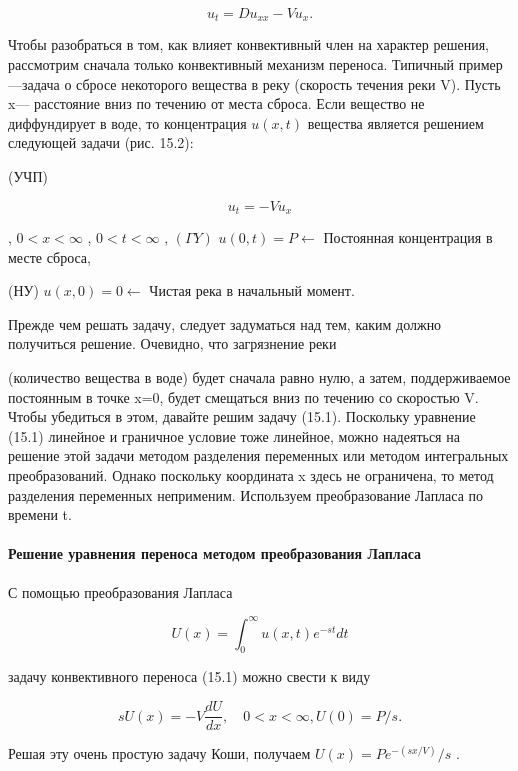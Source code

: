 \documentclass[
  ukrainian,
]{article}
\begin{document}
\[
u_t = Du_{xx} - Vu_x.
\]

Чтобы разобраться в том, как влияет конвективный член на характер
решения, рассмотрим сначала только конвективный механизм переноса.
Типичный пример---задача о сбросе некоторого вещества в реку (скорость
течения реки V). Пусть x--- расстояние вниз по течению от места сброса.
Если вещество не диффундирует в воде, то концентрация \(u(x, t)\)
вещества является решением следующей задачи (рис. 15.2):

(УЧП)

\[
u_t = -Vu_x
\]

, \(0 < x < \infty\) , \(0 < t < \infty\) , \((\Gamma Y)\)
\(u(0, t) = P \leftarrow\) Постоянная концентрация в месте сброса,

(НУ) \(u(x, 0) = 0 \leftarrow\) Чистая река в начальный момент.

Прежде чем решать задачу, следует задуматься над тем, каким должно
получиться решение. Очевидно, что загрязнение реки

(количество вещества в воде) будет сначала равно нулю, а затем,
поддерживаемое постоянным в точке x=0, будет смещаться вниз по течению
со скоростью V. Чтобы убедиться в этом, давайте решим задачу (15.1).
Поскольку уравнение (15.1) линейное и граничное условие тоже линейное,
можно надеяться на решение этой задачи методом разделения переменных или
методом интегральных преобразований. Однако поскольку координата x здесь
не ограничена, то метод разделения переменных неприменим. Используем
преобразование Лапласа по времени t.

\paragraph{Решение уравнения переноса методом преобразования
Лапласа}\label{ux440ux435ux448ux435ux43dux438ux435-ux443ux440ux430ux432ux43dux435ux43dux438ux44f-ux43fux435ux440ux435ux43dux43eux441ux430-ux43cux435ux442ux43eux434ux43eux43c-ux43fux440ux435ux43eux431ux440ux430ux437ux43eux432ux430ux43dux438ux44f-ux43bux430ux43fux43bux430ux441ux430}

С помощью преобразования Лапласа

\[
U(x) = \int_{0}^{\infty} u(x, t) e^{-st} dt
\]

задачу конвективного переноса (15.1) можно свести к виду

\[
sU(x) = -V \frac{dU}{dx}, \quad 0 < x < \infty,
U(0) = P/s.
\]

Решая эту очень простую задачу Коши, получаем \(U(x) = Pe^{-(sx/V)}/s\)
.
\end{document}
